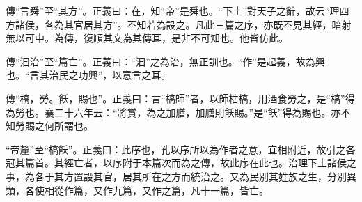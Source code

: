 {\noindent\zhuan{}\fzbyks 傳“言舜”至“其方”。正義曰：在，知“帝”是舜也。“下土”對天子之辭，故云“理四方諸侯，各為其官居其方”。不知若為設之。凡此三篇之序，亦既不見其經，暗射無以可中。為傳，復順其文為其傳耳，是非不可知也。他皆仿此。 \par}

{\noindent\zhuan{}\fzbyks 傳“汩治”至“篇亡”。正義曰：“汩”之為治，無正訓也。“作”是起義，故為興也。“言其治民之功興”，以意言之耳。 \par}

{\noindent\zhuan{}\fzbyks 傳“槁，勞。飫，賜也”。正義曰：言“槁師”者，以師枯槁，用酒食勞之，是“槁”得為勞也。襄二十六年云：“將賞，為之加膳，加膳則飫賜。”是“飫”得為賜也。亦不知勞賜之何所謂也。 \par}

{\noindent\shu{}\fzkt “帝釐”至“槁飫”。正義曰：此序也，孔以序所以為作者之意，宜相附近，故引之各冠其篇首。其經亡者，以序附于本篇次而為之傳，故此序在此也。治理下土諸侯之事，為各于其方置設其官，居其所在之方而統治之。又為民別其姓族之生，分別異類，各使相從作篇，又作九篇，又作之篇，凡十一篇，皆亡。 \par}

